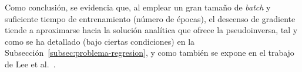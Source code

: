 Como conclusión, se evidencia que, al emplear un gran tamaño de \textit{batch} y suficiente tiempo de entrenamiento (número de épocas), el descenso de gradiente tiende a aproximarse hacia la solución analítica que ofrece la pseudoinversa, tal y como se ha detallado (bajo ciertas condiciones) en la Subsección~\ref{subsec:problema-regresion}, y como también se expone en el trabajo de Lee et al.~\cite{Lee2016}.\newline

\endinput
